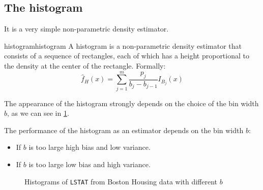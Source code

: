 \subsection{The histogram}
It is a very simple non-parametric density estimator.

\begin{definition}{histogram}{histogram}
	A histogram is a non-parametric density estimator that consists of a sequence of
	rectangles, each of which has a height proportional to the density at the center of
	the rectangle.
	\tcblower
	Formally:
	\begin{equation*}
		\widehat{f}_H(x) = \sum_{j=1}^m \frac{p_j}{b_j - b_{j-1}} I_{B_j}(x)
	\end{equation*}
\end{definition}

The appearance of the histogram strongly depends on the choice of the bin width $b$,
as we can see in \cref{fig:histogram_bins}.

\begin{note}
	The performance of the histogram as an estimator depends on the bin width $b$:
	\begin{itemize}
		\item If $b$ is too large \textrightarrow high bias and low variance.
		\item If $b$ is too large \textrightarrow low bias and high variance.
	\end{itemize}
\end{note}

\begin{figure}[H]
	\caption{Histograms of \texttt{LSTAT} from Boston Housing data with different $b$}%
	\label{fig:histogram_bins}
\end{figure}

